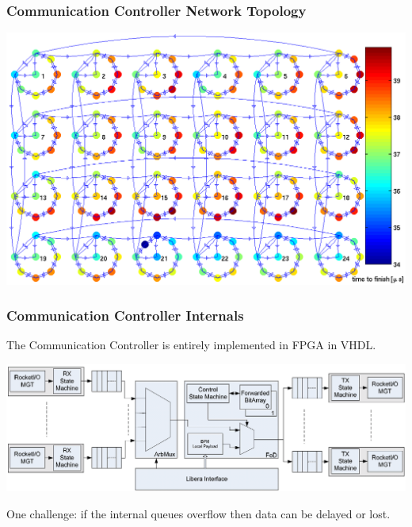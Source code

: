 \documentclass{beamer}
\begin{document}
%
\begin{frame}\frametitle{Communication Controller Network Topology}
\includegraphics[width=\linewidth]{fofb}
\end{frame}



%
\begin{frame}\frametitle{Communication Controller Internals}

The Communication Controller is entirely implemented in FPGA in VHDL.

\medskip

\includegraphics[width=\linewidth]{cc-internal}

\medskip

One challenge: if the internal queues overflow then data can be delayed or lost.

\end{frame}
\end{document}
